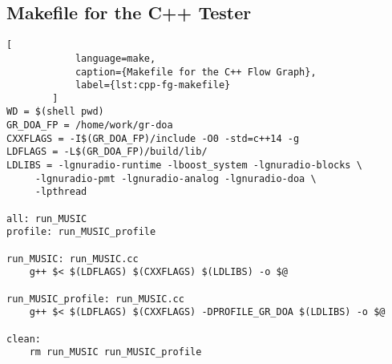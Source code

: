 	\subsection{Makefile for the C++ Tester}
	\label{ssec:makefile-profiling}
		\begin{lstlisting}[
		    language=make,
		    caption={Makefile for the C++ Flow Graph},
		    label={lst:cpp-fg-makefile}
		]
WD = $(shell pwd)
GR_DOA_FP = /home/work/gr-doa
CXXFLAGS = -I$(GR_DOA_FP)/include -O0 -std=c++14 -g
LDFLAGS = -L$(GR_DOA_FP)/build/lib/
LDLIBS = -lgnuradio-runtime -lboost_system -lgnuradio-blocks \
	 -lgnuradio-pmt -lgnuradio-analog -lgnuradio-doa \
	 -lpthread

all: run_MUSIC
profile: run_MUSIC_profile

run_MUSIC: run_MUSIC.cc
	g++ $< $(LDFLAGS) $(CXXFLAGS) $(LDLIBS) -o $@

run_MUSIC_profile: run_MUSIC.cc
	g++ $< $(LDFLAGS) $(CXXFLAGS) -DPROFILE_GR_DOA $(LDLIBS) -o $@

clean:
	rm run_MUSIC run_MUSIC_profile
	\end{lstlisting}


